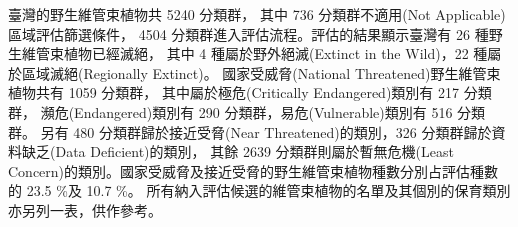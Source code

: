 臺灣的野生維管束植物共 5240 分類群，
其中 736 分類群不適用(Not Applicable)區域評估篩選條件，
4504 分類群進入評估流程。評估的結果顯示臺灣有 26 種野生維管束植物已經滅絕，
其中 4 種屬於野外絕滅(Extinct in the Wild)，22 種屬於區域滅絕(Regionally Extinct)。
國家受威脅(National Threatened)野生維管束植物共有 1059 分類群，
其中屬於極危(Critically Endangered)類別有 217 分類群，
瀕危(Endangered)類別有 290 分類群，易危(Vulnerable)類別有 516 分類群。
另有 480 分類群歸於接近受脅(Near Threatened)的類別，326 分類群歸於資料缺乏(Data Deficient)的類別，
其餘 2639 分類群則屬於暫無危機(Least Concern)的類別。國家受威脅及接近受脅的野生維管束植物種數分別占評估種數的 23.5 \%及 10.7 \%。
所有納入評估候選的維管束植物的名單及其個別的保育類別亦另列一表，供作參考。
